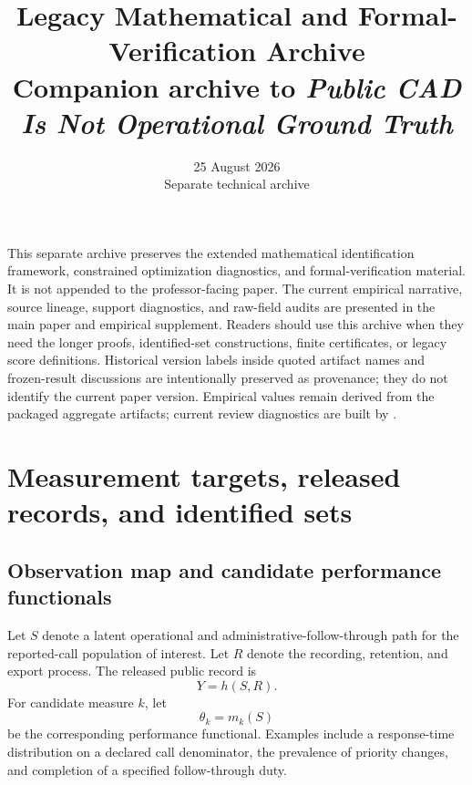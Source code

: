 \documentclass[11pt]{article}
\title{\vspace{-1.6em}\textbf{Legacy Mathematical and Formal-Verification Archive}\\[0.35em]
\large Companion archive to \emph{Public CAD Is Not Operational Ground Truth}}
\author{}
\date{25 August 2026\\[0.2em]\small Separate technical archive}
\begin{document}
\maketitle
\thispagestyle{plain}
\vspace{-1.2em}

\begin{plainbox}[title=Purpose and reading guide]
This separate archive preserves the extended mathematical identification framework, constrained optimization diagnostics, and formal-verification material. It is not appended to the professor-facing paper. The current empirical narrative, source lineage, support diagnostics, and raw-field audits are presented in the main paper and empirical supplement. Readers should use this archive when they need the longer proofs, identified-set constructions, finite certificates, or legacy score definitions. Historical version labels inside quoted artifact names and frozen-result discussions are intentionally preserved as provenance; they do not identify the current paper version. Empirical values remain derived from the packaged aggregate artifacts; current review diagnostics are built by .
\end{plainbox}

\setcounter{tocdepth}{1}
\begingroup
\small
\tableofcontents
\endgroup
\newpage

\section{Measurement targets, released records, and identified sets}
\label{sec:measurement_map}

\subsection{Observation map and candidate performance functionals}

Let $S$ denote a latent operational and administrative-follow-through path for the reported-call population of interest. Let $R$ denote the recording, retention, and export process. The released public record is
\begin{equation}
Y=h(S,R).
\label{eq:observation_map}
\end{equation}
For candidate measure $k$, let
\begin{equation}
\theta_k=m_k(S)
\label{eq:performance_functional}
\end{equation}
be the corresponding performance functional. Examples include a response-time distribution on a declared call denominator, the prevalence of priority changes, and completion of a specified follow-through duty.
\end{document}
